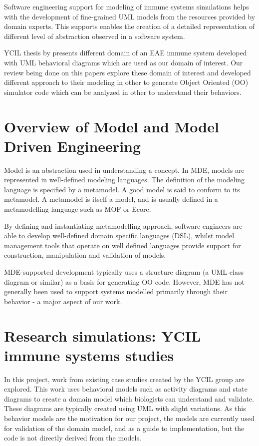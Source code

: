 \documentclass[12pt, a4paper]{report}
\begin{document}
Software engineering support for modeling of immune systems simulations helps with the development of fine-grained UML models from the resources provided by domain experts. This supports enables the creation of a detailed representation of different level of abstraction observed in a software system. 

YCIL thesis by \cite{Read2011} presents different domain of an EAE immune system developed with UML behavioral diagrams which are used as our domain of interest. Our review being done on this papers explore these domain of interest and developed different approach to their modeling in other to generate Object Oriented (OO) simulator code which can be analyzed in other to understand their behaviors.

\section{Overview of Model and Model Driven Engineering}
Model is an abstraction used in understanding a concept. In MDE, models are represented in well-defined modeling languages.  The definition of the modeling language is specified by a metamodel. A good model is said to conform to its metamodel. A metamodel is itself a model, and is usually defined in a metamodelling language such as MOF or Ecore.

By defining and instantiating metamodelling approach, software engineers are able to develop well-defined domain specific languages (DSL), whilst model management tools that operate on well defined languages provide support for construction, manipulation and validation of models.  

MDE-supported development typically uses a structure diagram (a UML class diagram or similar) as a basis for generating OO code. However,
MDE has not generally been used to support systems modelled primarily through their behavior - a major aspect of our work.

\section{Research simulations: YCIL immune systems studies}

In this project, work from existing case studies created by the YCIL  group are explored. This work uses behavioral models such as activity diagrams and state diagrams to create a domain model which biologists can understand and validate. These diagrams are typically created using UML with slight variations. As this behavior models are the motivation for our project, the models are currently used for validation of the domain model, and as a guide to implementation, but the code is not directly derived from the models.
\end{document}
